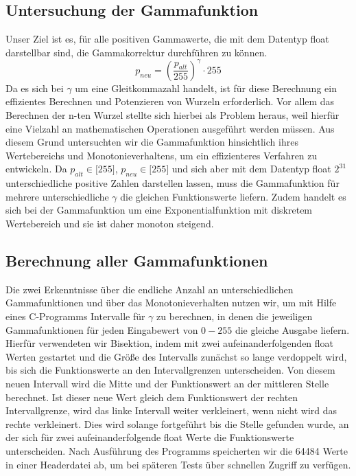 \documentclass[course=erap]{aspdoc}
\begin{document}
\subsection{Untersuchung der Gammafunktion}
Unser Ziel ist es, für alle positiven Gammawerte, die mit dem Datentyp float darstellbar sind, die Gammakorrektur durchführen zu können.
\begin{equation}
p_{neu} = \left(\frac{p_{alt}}{255}\right)^{\gamma} \cdot 255
\end{equation}   
Da es sich bei $\gamma$ um eine Gleitkommazahl handelt, ist für diese Berechnung ein effizientes Berechnen und Potenzieren von Wurzeln erforderlich. Vor allem das Berechnen der n-ten Wurzel stellte sich hierbei als Problem heraus, weil hierfür eine Vielzahl an mathematischen Operationen ausgeführt werden müssen. Aus diesem Grund untersuchten wir die Gammafunktion hinsichtlich ihres Wertebereichs und Monotonieverhaltens, um ein effizienteres Verfahren zu entwickeln.
Da $p_{alt} \in \lbrack255\rbrack$, $p_{neu} \in \lbrack255\rbrack$ und sich aber mit dem Datentyp float $2^{31}$ unterschiedliche positive Zahlen darstellen lassen, muss die Gammafunktion für mehrere unterschiedliche $\gamma$ die gleichen Funktionswerte liefern.  Zudem handelt es sich bei der Gammafunktion um eine Exponentialfunktion mit diskretem Wertebereich und sie ist daher monoton steigend.

\subsection{Berechnung aller Gammafunktionen}
Die zwei Erkenntnisse über die endliche Anzahl an unterschiedlichen Gammafunktionen und über das Monotonieverhalten nutzen wir, um mit Hilfe eines C-Programms Intervalle für $\gamma$ zu berechnen, in denen die jeweiligen Gammafunktionen für jeden Eingabewert von $0-255$ die gleiche Ausgabe liefern. Hierfür verwendeten wir Bisektion, indem mit zwei aufeinanderfolgenden float Werten gestartet und die Größe des Intervalls zunächst so lange verdoppelt wird, bis sich die Funktionswerte an den Intervallgrenzen unterscheiden. Von diesem neuen Intervall wird die Mitte und der Funktionswert an der mittleren Stelle berechnet. Ist dieser neue Wert gleich dem Funktionswert der rechten Intervallgrenze, wird das linke Intervall weiter verkleinert, wenn nicht wird das rechte verkleinert. Dies wird solange fortgeführt bis die Stelle gefunden wurde, an der sich für zwei aufeinanderfolgende float Werte die Funktionswerte unterscheiden. Nach Ausführung des Programms speicherten wir die 64484 Werte in einer Headerdatei ab, um bei späteren Tests über schnellen Zugriff zu verfügen.         
\end{document}
